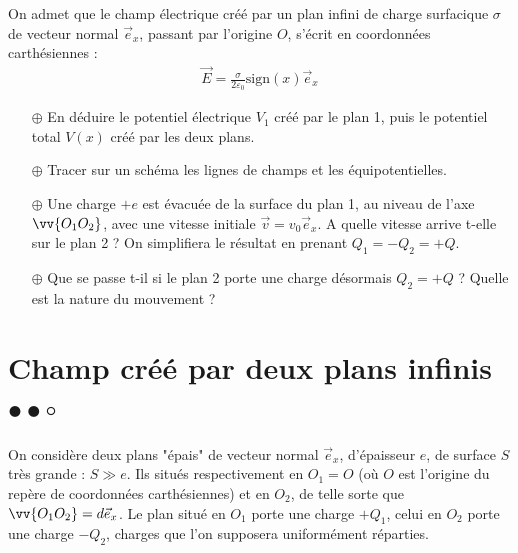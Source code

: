 \documentclass{report}
\begin{document}
On admet que le champ électrique créé par un plan infini de charge surfacique $\sigma$ de vecteur normal $\vec{e}_x$, passant par l'origine $O$, s'écrit en coordonnées carthésiennes :
\begin{align*}
	\vec{E}=\frac{\sigma}{2\varepsilon_0}\mathrm{sign}(x)\vec{e}_x
\end{align*}

\begin{itemize}

	\item[$\oplus$] En déduire le potentiel électrique $V_1$ créé par le plan 1, puis le potentiel total $V(x)$ créé par les deux plans.
	
	\item[$\oplus$] Tracer sur un schéma les lignes de champs et les équipotentielles. 
	
	\item[$\oplus$] Une charge $+e$ est évacuée de la surface du plan 1, au niveau de l'axe $\vv{O_1O_2}$, avec une vitesse initiale $\vec{v}=v_0\vec{e}_x$. A quelle vitesse arrive t-elle sur le plan 2 ? On simplifiera le résultat en prenant $Q_1=-Q_2=+Q$.
	
	\item[$\oplus$] Que se passe t-il si le plan 2 porte une charge désormais $Q_2=+Q$ ? Quelle est la nature du mouvement ? 

\end{itemize}

\newpage

\section*{Champ créé par deux plans infinis $\bullet\bullet\circ$}

On considère deux plans "épais" de vecteur normal $\vec{e}_x$, d'épaisseur $e$, de surface $S$ très grande : $S\gg e$. Ils situés respectivement en $O_1=O$ (où $O$ est l'origine du repère de coordonnées carthésiennes) et en $O_2$, de telle sorte que $\vv{O_1O_2}=d\vec{e}_x$. Le plan situé en $O_1$ porte une charge $+Q_1$, celui en $O_2$ porte une charge $-Q_2$, charges que l'on supposera uniformément réparties. 
\end{document}
